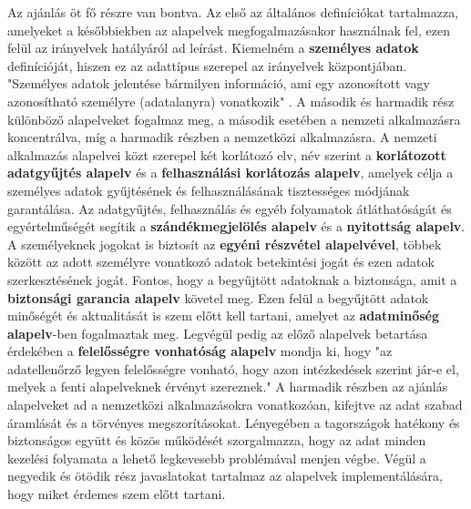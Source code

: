 Az ajánlás öt fő részre van bontva. Az első az általános definíciókat tartalmazza, amelyeket a későbbiekben az alapelvek megfogalmazásakor használnak fel, ezen felül az irányelvek hatályáról ad leírást. Kiemelném a \textbf{személyes adatok} definícióját, hiszen ez az adattípus szerepel az irányelvek központjában. "Személyes adatok jelentése bármilyen információ, ami egy azonosított vagy
azonosítható személyre (adatalanyra) vonatkozik" \cite{OECD}. A második és harmadik rész különböző alapelveket fogalmaz meg, a második esetében a nemzeti alkalmazásra koncentrálva, míg a harmadik részben a nemzetközi alkalmazásra. A nemzeti alkalmazás alapelvei közt szerepel két korlátozó elv, név szerint a \textbf{korlátozott adatgyűjtés alapelv} és a \textbf{felhasználási korlátozás alapelv}, amelyek célja a személyes adatok gyűjtésének és felhasználásának tisztességes módjának garantálása. Az adatgyűjtés, felhasználás és egyéb folyamatok átláthatóságát és egyértelműségét segítik a \textbf{szándékmegjelölés alapelv} és a \textbf{nyitottság alapelv}. A személyeknek jogokat is biztosít az \textbf{egyéni részvétel alapelvével}, többek között az adott személyre vonatkozó adatok betekintési jogát és ezen adatok szerkesztésének jogát. Fontos, hogy a begyűjtött adatoknak a biztonsága, amit a \textbf{biztonsági garancia alapelv} követel meg. Ezen felül a begyűjtött adatok minőségét és aktualitását is szem előtt kell tartani, amelyet az \textbf{adatminőség alapelv}-ben fogalmaztak meg. Legvégül pedig az előző alapelvek betartása érdekében a \textbf{felelősségre vonhatóság alapelv} mondja ki, hogy "az adatellenőrző legyen felelősségre vonható, hogy azon intézkedések szerint jár-e el,
melyek a fenti alapelveknek érvényt szereznek." \cite{OECD} A harmadik részben az ajánlás alapelveket ad a nemzetközi alkalmazásokra vonatkozóan, kifejtve az adat szabad áramlását és a törvényes megszorításokat. Lényegében a tagországok hatékony és biztonságos együtt és közös működését szorgalmazza, hogy az adat minden kezelési folyamata a lehető legkevesebb problémával menjen végbe. Végül a negyedik és ötödik rész javaslatokat tartalmaz az alapelvek implementálására, hogy miket érdemes szem előtt tartani.